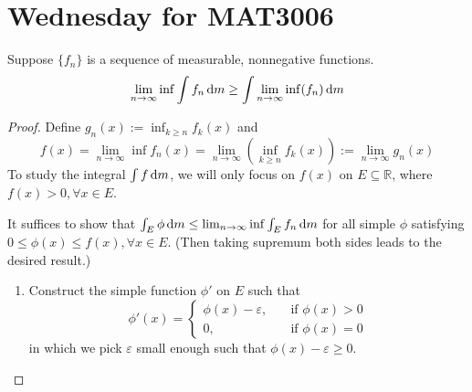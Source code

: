 
\section{Wednesday for MAT3006}

\begin{proposition}
Suppose $\{f_n\}$ is a sequence of measurable, nonnegative functions.
\[
\lim_{n\to\infty}\inf \int f_n\,\mathrm{d} m
\ge
\int
\lim_{n\to\infty}\inf(f_n)\,\mathrm{d} m
\]
\end{proposition}

\begin{proof}
Define $g_n(x) := \inf_{k \geq n} f_k(x)$ and 
\[
f(x)=\lim_{n\to\infty}\inf f_n(x)
=\lim_{n\to\infty}\left(\inf_{k\ge n}f_k(x)\right):=\lim_{n\to\infty}g_n(x)
\]
To study the integral $\int f\,\mathrm{d} m$, we will only focus on $f(x)$ on $E\subseteq\mathbb{R}$, where $f(x)>0,\forall x\in E$. 

It suffices to show that $\int_E\phi\,\mathrm{d} m\le \lim_{n\to\infty}\inf\int_Ef_n\,\mathrm{d} m$ for all simple $\phi$ satisfying $0\le \phi(x)\le f(x),\forall x\in E$.
(Then taking supremum both sides leads to the desired result.)

\begin{enumerate}
\item
Construct the simple function $\phi'$ on $E$ such that 
\[
\phi'(x)=\left\{
\begin{aligned}
\phi(x)-\varepsilon,&\quad\text{if $\phi(x)>0$}\\
0,&\quad\text{if $\phi(x)=0$}
\end{aligned}
\right.
\]
in which we pick $\varepsilon$ small enough such that $\phi(x)-\varepsilon\ge0$.


\end{enumerate}
\end{proof}
